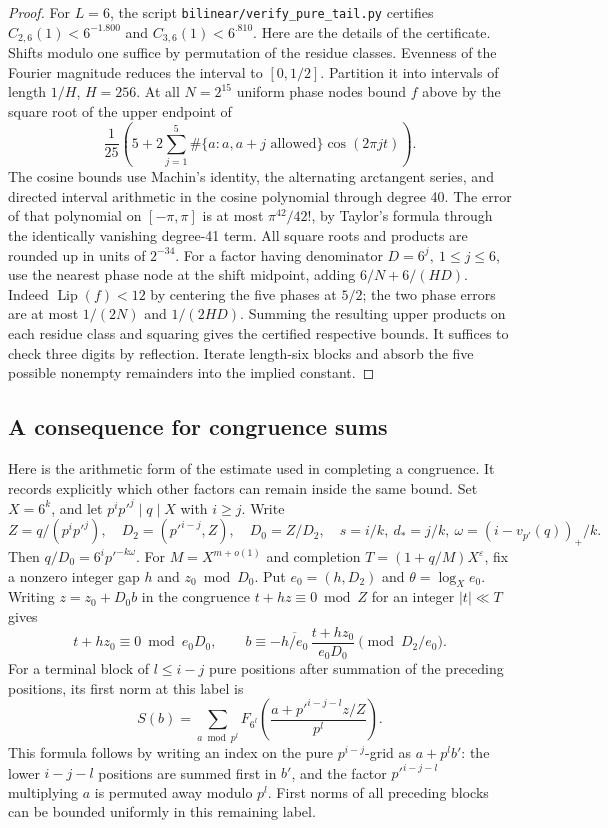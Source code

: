 \documentclass[11pt,a4paper]{article}
\theoremstyle{paperplain}
\numberwithin{equation}{section}
\begin{document}
\begin{proof}
For \(L=6\), the script
\texttt{bilinear/verify\_pure\_tail.py} certifies
\(C_{2,6}(1)<6^{-1.800}\) and \(C_{3,6}(1)<6^{.810}\).
Here are the details of the certificate. Shifts modulo one
suffice by permutation of the residue classes. Evenness of
the Fourier magnitude reduces the interval to \([0,1/2]\).
Partition it into intervals of length \(1/H\), \(H=256\).
At all \(N=2^{15}\) uniform phase nodes bound \(f\) above by
the square root of the upper endpoint of
\[
 \frac1{25}\left(5+2\sum_{j=1}^5
  \#\{a:a,a+j\text{ allowed}\}\cos(2\pi j t)\right).
\]
The cosine bounds use Machin's identity, the alternating
arctangent series, and directed interval arithmetic in the
cosine polynomial through degree 40. The error of that
polynomial on \([-\pi,\pi]\) is at most \(\pi^{42}/42!\),
by Taylor's formula through the identically vanishing
degree-41 term. All square roots and products are rounded
up in units of \(2^{-34}\).
For a factor having denominator \(D=6^j,\ 1\le j\le6\),
use the nearest phase node at the shift midpoint, adding
\(6/N+6/(HD)\). Indeed \(\operatorname{Lip}(f)<12\) by
centering the five phases at \(5/2\); the two phase errors
are at most \(1/(2N)\) and \(1/(2HD)\).
Summing the resulting upper products on each residue class
and squaring gives the certified respective bounds.
It suffices to check three digits by reflection. Iterate
length-six blocks and absorb the five possible nonempty
remainders into the implied constant.
\end{proof}

\subsection{A consequence for congruence sums}
Here is the arithmetic form of the estimate used in
completing a congruence. It records explicitly which
other factors can remain inside the same bound. Set
\(X=6^k\), and let \(p^i p'^j\mid q\mid X\) with \(i\ge j\).
Write
\[
 Z=q/(p^i p'^j),\quad D_2=(p'^{i-j},Z),\quad D_0=Z/D_2,\quad
 s=i/k,\ d_*=j/k,\ \omega=(i-v_{p'}(q))_+/k .
\]
Then \(q/D_0=6^i p'^{-k\omega}\).
For \(M=X^{m+o(1)}\) and completion
\(T=(1+q/M)X^\varepsilon\), fix a nonzero integer gap
\(h\) and \(z_0\bmod D_0\). Put \(e_0=(h,D_2)\) and
\(\theta=\log_X e_0\).
Writing \(z=z_0+D_0b\) in the congruence
\(t+hz\equiv0\bmod Z\) for an integer \(|t|\ll T\) gives
\[
 t+hz_0\equiv0\bmod e_0D_0,\qquad
 b\equiv-\overline{h/e_0}\,\frac{t+hz_0}{e_0D_0}
                 \pmod{D_2/e_0}.
\]
For a terminal block of \(l\le i-j\) pure positions
after summation of the preceding positions, its first
norm at this label is
\[
 S(b)=\sum_{a\bmod p^l}
 F_{6^l}\left(\frac{a+p'^{i-j-l}z/Z}{p^l}\right).
\]
This formula follows by writing an index on the pure
\(p^{i-j}\)-grid as \(a+p^lb'\): the lower \(i-j-l\)
positions are summed first in \(b'\), and the factor
\(p'^{i-j-l}\) multiplying \(a\) is permuted away modulo
\(p^l\). First norms of all preceding blocks can be bounded
uniformly in this remaining label.
\end{document}
